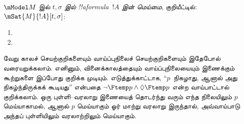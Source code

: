 \documentclass[../../../include/open-logic-section]{subfiles}
\begin{document}
\begin{defn}
  $\mModel M$ இல் \emph{$t, \sigma$ இல் !!a{formula}~$!A$ இன் மெய்மை},
  குறியீட்டில்: $\mSat{M}{!A}[t, \sigma]$:
  \begin{enumerate}
  \item{} 
  \item{} 
  \end{enumerate}
\end{defn}

வேறு காலச் செயற்குறிகளையும் வாய்ப்புநிலைச் செயற்குறிகளையும் இதேபோல்
வரையறுக்கலாம். எனினும், வினைக்காலத்தையும் வாய்ப்புநிலையையும் இணைக்கும்
கூற்றுகளை இப்போது குறிக்க முடியும். எடுத்துக்காட்டாக, ``$p$~நிகழாது, ஆனால்
அது நிகழ்ந்திருக்கக் கூடியது'' என்பதை $\lnot \Ftemp p \land \Diamond \Ftemp p$
என்ற வாய்பாட்டால் குறிக்கலாம். ஒரு புள்ளி–வரலாறு இணையைத் தொடர்ந்து வரும்
எந்த நிலையிலும் $p$ மெய்யாகாமல், ஆனால் $p$ மெய்யாகும் ஓர் மாற்று வரலாறு
இருந்தால், அவ்வாய்பாடு அந்தப் புள்ளியிலும் வரலாற்றிலும் மெய்யாகும்.
\end{document}
